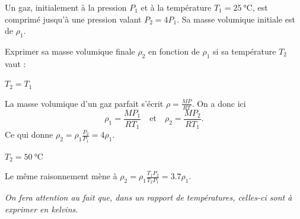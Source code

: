 \hauteurLargeurCadreReponse			{7mm}{3cm}
\initialisationEntrainement

Un gaz, initialement à la pression $P_1$ et à la température $T_1=\SI{25}{\celsius}$, est comprimé jusqu'à une pression valant $P_2=4P_1$. Sa masse volumique initiale est de $\rho_1$. 

Exprimer sa masse volumique finale $\rho_2$ en fonction de $\rho_1$ si sa température $T_2$ vaut :  

\debutEntrainement

\begin{enonce}
$T_2 = T_1$
\end{enonce}


\begin{corrige}
La masse volumique d'un gaz parfait s'écrit $\rho=\frac{MP}{RT}$. On a donc ici 
\[
\rho_1=\frac{MP_1}{RT_1}
\quad\text{et}\quad
\rho_2=\frac{MP_2}{RT_1}.
\]
Ce qui donne $\rho_2=\rho_1\frac{P_2}{P_1}=4\rho_1$.
\end{corrige}


\begin{enonce}
$T_2 = \SI{50}{\celsius}$
\end{enonce}


\begin{corrige}
Le même raisonnement mène à $\rho_2=\rho_1\frac{T_1P_2}{T_2P_1}=\num{3,7}\rho_1$.

{\itshape On fera attention au fait que, dans un rapport de températures, celles-ci sont à exprimer en kelvins.}
\end{corrige}

